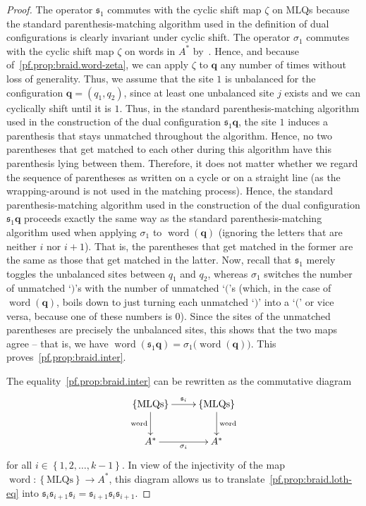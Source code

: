\documentclass[reqno]{amsart}
\newcommand{\0}{\phantom{c}}
\DeclareMathOperator{\inter}{int} %
\newcommand{\qq}{\mathbf{q}}
\newcommand{\fraks}{\mathfrak{s}}
\newcommand{\word}{\operatorname{word}}
\newcommand{\set}[1]{\left\{ #1 \right\}}
\theoremstyle{plain}
\theoremstyle{definition}
\numberwithin{equation}{section}
\begin{document}
\begin{proof}
The operator $\fraks_1$ commutes with the cyclic shift map $\zeta$ on MLQs because the standard parenthesis-matching algorithm used in the definition of dual configurations is clearly invariant under cyclic shift.
The operator $\sigma_1$ commutes with the cyclic shift map $\zeta$ on words in $A^*$ by~\cite[Prop.~5.6.1]{Loth}.
Hence, and because of~\eqref{pf.prop:braid.word-zeta}, we can apply $\zeta$ to $\qq$ any number of times without loss of generality.
Thus, we assume that the site $1$ is unbalanced for the configuration $\qq = (q_1, q_2)$, since at least one unbalanced site $j$ exists and we can cyclically shift until it is $1$.
Thus, in the standard parenthesis-matching algorithm used in the construction of the dual configuration $\fraks_1 \qq$, the site $1$ induces a parenthesis that stays unmatched throughout the algorithm.
Hence, no two parentheses that get matched to each other during this algorithm have this parenthesis lying between them.
Therefore, it does not matter whether we regard the sequence of parentheses as written on a cycle or on a straight line (as the wrapping-around is not used in the matching process).
Hence, the standard parenthesis-matching algorithm used in the construction of the dual configuration $\fraks_1 \qq$ proceeds exactly the same way as the standard parenthesis-matching algorithm used when applying $\sigma_1$ to $\word(\qq)$ (ignoring the letters that are neither $i$ nor $i+1$). That is, the parentheses that get matched in the former are the same as those that get matched in the latter.
Now, recall that $\fraks_1$ merely toggles the unbalanced sites between $q_1$ and $q_2$, whereas $\sigma_1$ switches the number of unmatched `$)$'s with the number of unmatched `$($'s (which, in the case of $\word(\qq)$, boils down to just turning each unmatched `$)$' into a `$($' or vice versa, because one of these numbers is $0$).
Since the sites of the unmatched parentheses are precisely the unbalanced sites, this shows that the two maps agree -- that is, we have $\word(\fraks_1 \qq) = \sigma_1\bigl( \word(\qq) \bigr)$.
This proves~\eqref{pf.prop:braid.inter}.

The equality~\eqref{pf.prop:braid.inter} can be rewritten as the
commutative diagram
\[
\xymatrix{
 \set{\text{MLQs}} \ar[r]^{\fraks_i} \ar[d]_{\word} & \set{\text{MLQs}} \ar[d]^{\word} \\
 A^* \ar[r]_{\sigma_i} & A^*
}
\]
for all $i \in \set{1, 2, \dotsc, k-1}$.
In view of the injectivity of the map $\word \colon \set{\text{MLQs}} \to A^*$,
this diagram allows us to translate~\eqref{pf.prop:braid.loth-eq} into
$\fraks_i \fraks_{i+1} \fraks_i = \fraks_{i+1} \fraks_i \fraks_{i+1}$.
\end{proof}
\end{document}
